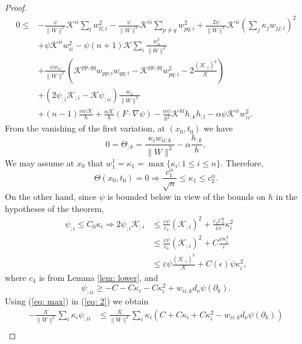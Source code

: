 \documentclass{amsart}
\theoremstyle{definition}
\theoremstyle{remark}
\numberwithin{equation}{section}
\begin{document}
\begin{proof}
\begin{align*}
0 \leq& -\frac{\psi}{\|W\|^2} \mathcal{K}^{ii} \sum_lw_{ll;i}^2 - \frac{\psi}{\|W\|^2} \mathcal{K}^{ii} \sum_{p\ne q}w_{pq;i}^2 + \frac{2\psi}{\|W\|^4} \mathcal{K}^{ii} \left(\sum_j\kappa_jw_{jj;i}\right)^2 \\
&+ \psi\mathcal{K}^{ii} w_{ii}^2 - \psi(n+1) \mathcal{K} \sum_i\frac{w_{ii}^3}{\|W\|^2} \\
&+ \frac{\psi w_{ii}}{\|W\|^2} \left(\mathcal{K}^{pp,qq}w_{pp;i}w_{qq;i} - \mathcal{K}^{pp,qq}w_{pq;i}^2 - 2\frac{(\mathcal{K}_{;i})^2}{\mathcal{K}}\right) \\
&+ (2\psi_{;i}\mathcal{K}_{;i} - \mathcal{K}\psi_{;ii}) \frac{w_{ii}}{\|W\|^2} \\
&+ (n-1) \frac{\alpha\psi\mathcal{K}}{h} + \frac{\alpha\mathcal{K}}{h}(F\cdot\nabla\psi) - \frac{\alpha\psi}{h^2}\mathcal{K}^{kl} h_{;k} h_{;l} - \alpha\psi\mathcal{K}^{ii}w_{ii}^2.
\end{align*}
From the vanishing of the first variation, at $(x_0,t_0)$ we have
\begin{equation}\label{eq: max}
0 = \Theta_{;k} = \frac{\kappa_iw_{ii;k}}{\|W\|^2} - \alpha\frac{h_{;k}}{h},
\end{equation}
We may assume at $x_0$ that $w_1^1=\kappa_1=\max\{\kappa_i:1\leq i\leq n\}.$ Therefore,
\begin{equation}\label{eq: max1}
\Theta(x_0,t_0)=0\Rightarrow\frac{c_1^{\alpha}}{\sqrt{n}}\leq \kappa_1\leq c_2^{\alpha}.
\end{equation}
On the other hand, since $\psi$ is bounded below in view of the bounds on $h$ in the hypotheses of the theorem,
\begin{align}\label{eq: 1}
\psi_{;i} \leq C_0\kappa_i \Rightarrow 2\psi_{;i} \mathcal{K}_{;i}&\leq \frac{\varepsilon\psi}{c_4} (\mathcal{K}_{;i})^2 + \frac{c_4C_0^2}{\psi\varepsilon}\kappa_i^2\nonumber\\
&\leq \frac{\varepsilon\psi}{c_4} (\mathcal{K}_{;i})^2 + C\frac{\psi\kappa_i^2}{\varepsilon}\nonumber\\
&\leq \varepsilon\psi \frac{(\mathcal{K}_{;i})^2}{\mathcal{K}} + C(\epsilon) \psi\kappa_i^2,
\end{align}
where $c_4$ is from Lemma \ref{lem: lower},
and
\begin{equation}\label{eq: 2}
\psi_{;ii} \geq - C - C\kappa_i - C\kappa_i^2 + w_{ii;k} d_{\nu} \psi(\partial_k).
\end{equation}
Using (\ref{eq: max}) in (\ref{eq: 2}) we obtain
\begin{align}\label{eq: 3}
-\frac{\mathcal{K}}{\|W\|^2}\sum_i\kappa_i \psi_{;ii}&\leq \frac{\mathcal{K}}{\|W\|^2}\sum_i \kappa_i(C+C\kappa_i+C\kappa_i^2-w_{ii;k}d_{\nu}\psi(\partial_k))\nonumber\\

\end{align}
\end{proof}
\end{document}
